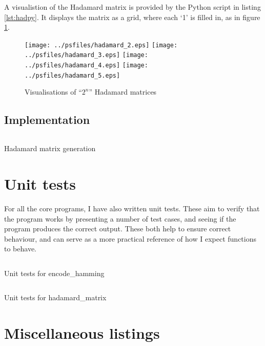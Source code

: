 \documentclass[a4paper,11pt]{article}
\newenvironment{longlisting}
{\addvspace{\baselineskip}\captionsetup{type=listing}}
{\addvspace{\baselineskip}}
\begin{document}
    A visualistion of the Hadamard matrix is provided by the Python script in
    listing \ref{lst:hadpy}. It displays the matrix as a grid, where each `1' is
    filled in, as in figure \ref{fig:hadvis}.

\begin{figure}[H]
\begin{center}
\texttt{[image: ../psfiles/hadamard\_2.eps]}
\texttt{[image: ../psfiles/hadamard\_3.eps]}
\texttt{[image: ../psfiles/hadamard\_4.eps]}
\texttt{[image: ../psfiles/hadamard\_5.eps]}
\end{center}
\caption{Visualisations of ``$2^n$'' Hadamard matrices}\label{fig:hadvis}
\end{figure}

    \subsection{Implementation}

\begin{longlisting}
\inputminted{python}{../src/hadamard_matrix.py}
\caption{Hadamard matrix generation}\label{lst:hadgen}
\end{longlisting}

    \section{Unit tests}

    For all the core programs, I have also written unit tests. These aim to
    verify that the program works by presenting a number of test cases, and
    seeing if the program produces the correct output. These both help to ensure
    correct behaviour, and can serve as a more practical reference of how I
    expect functions to behave.

\begin{longlisting}
\inputminted{python}{../src/test_encode_hamming.py}
\caption{Unit tests for encode\_hamming}\label{lst:testhammingbin}
\end{longlisting}

\begin{longlisting}
\inputminted{python}{../src/test_hadamard_matrix.py}
\caption{Unit tests for hadamard\_matrix}\label{lst:testhadamardmat}
\end{longlisting}

    \section{Miscellaneous listings}
\end{document}

